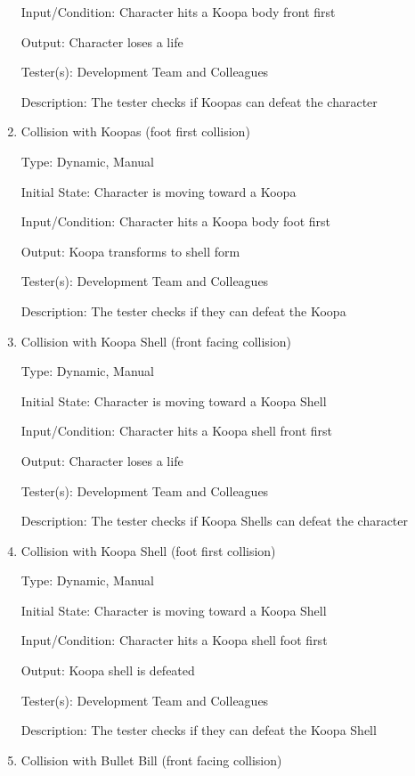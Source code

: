 \documentclass[12pt, titlepage]{article}
\begin{document}
\begin{enumerate}
Input/Condition: Character hits a Koopa body front first

Output: Character loses a life

Tester(s): Development Team and Colleagues

Description: The tester checks if Koopas can defeat the character


\item{Collision with Koopas (foot first collision)\\}

Type: Dynamic, Manual

Initial State: Character is moving toward a Koopa

Input/Condition: Character hits a Koopa body foot first

Output: Koopa transforms to shell form

Tester(s): Development Team and Colleagues

Description: The tester checks if they can defeat the Koopa


\item{Collision with Koopa Shell (front facing collision)\\}

Type: Dynamic, Manual

Initial State: Character is moving toward a Koopa Shell

Input/Condition: Character hits a Koopa shell front first

Output: Character loses a life

Tester(s): Development Team and Colleagues

Description: The tester checks if Koopa Shells can defeat the character


\item{Collision with Koopa Shell (foot first collision)\\}

Type: Dynamic, Manual

Initial State: Character is moving toward a Koopa Shell

Input/Condition: Character hits a Koopa shell foot first

Output: Koopa shell is defeated

Tester(s): Development Team and Colleagues

Description: The tester checks if they can defeat the Koopa Shell



\item{Collision with Bullet Bill (front facing collision)\\}


\end{enumerate}
\end{document}
